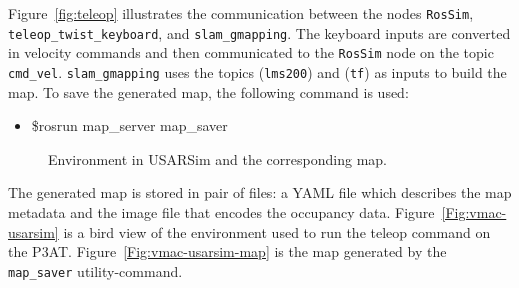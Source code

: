 Figure~\ref{fig:teleop} illustrates the communication between the nodes \texttt{RosSim}, \texttt{teleop\_twist\_keyboard}, and \texttt{slam\_gmapping}. The keyboard inputs are converted in velocity commands and then communicated to the \texttt{RosSim} node on the topic \texttt{cmd\_vel}. \texttt{slam\_gmapping} uses the topics (\texttt{lms200}) and (\texttt{tf}) as inputs to build the map. To save the generated map, the following command is used:

\begin{itemize}
\item[]\$rosrun map\_server map\_saver
\end{itemize}

\begin{figure}[t!]
\centering
{}\qquad
{}
\caption{Environment in USARSim and the corresponding map.}
\end{figure}
The generated map is stored in pair of files: a YAML file which describes the map metadata and the image file that encodes the occupancy data. Figure~\ref{Fig:vmac-usarsim} is a bird view of the environment used to run the teleop command on the P3AT. Figure~\ref{Fig:vmac-usarsim-map} is the map generated by the \texttt{map\_saver} utility-command.







